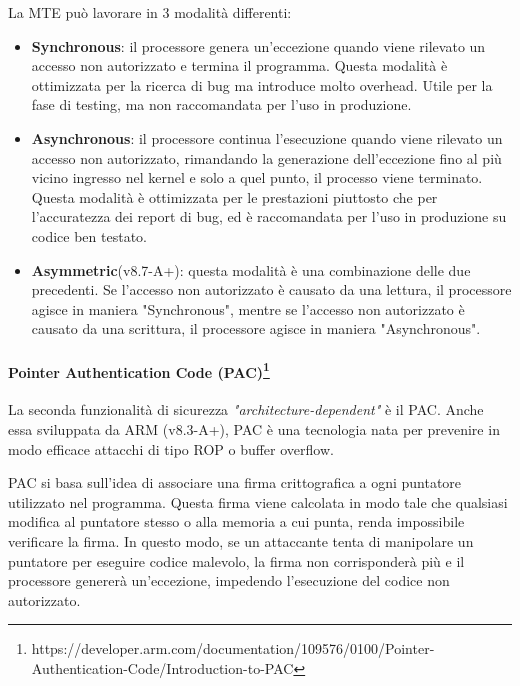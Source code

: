 La MTE può lavorare in 3 modalità differenti:
\begin{itemize}
  \item \textbf{Synchronous}: il processore genera un'eccezione quando viene rilevato
    un accesso non autorizzato e termina il programma. Questa modalità è
    ottimizzata per la ricerca di bug ma introduce molto overhead. Utile per la fase
    di testing, ma non raccomandata per l'uso in produzione.

  \item \textbf{Asynchronous}: il processore continua l'esecuzione quando viene rilevato
    un accesso non autorizzato, rimandando la generazione dell'eccezione fino al
    più vicino ingresso nel kernel e solo a quel punto, il processo viene terminato.
    Questa modalità è ottimizzata per le prestazioni piuttosto che per l'accuratezza
    dei report di bug, ed è raccomandata per l'uso in produzione su codice ben testato.

  \item \textbf{Asymmetric}(v8.7-A+): questa modalità è una combinazione delle
    due precedenti. Se l'accesso non autorizzato è causato da una lettura, il
    processore agisce in maniera "Synchronous", mentre se l'accesso non autorizzato
    è causato da una scrittura, il processore agisce in maniera "Asynchronous".
\end{itemize}

\paragraph{Pointer Authentication Code (PAC)\protect\footnote{https://developer.arm.com/documentation/109576/0100/Pointer-Authentication-Code/Introduction-to-PAC}}
La seconda funzionalità di sicurezza \textit{"architecture-dependent"} è il PAC.
Anche essa sviluppata da ARM (v8.3-A+), PAC è una tecnologia nata per prevenire in
modo efficace attacchi di tipo ROP o buffer overflow.

PAC si basa sull'idea di associare una firma crittografica a ogni puntatore utilizzato
nel programma. Questa firma viene calcolata in modo tale che qualsiasi modifica
al puntatore stesso o alla memoria a cui punta, renda impossibile verificare la firma.
In questo modo, se un attaccante tenta di manipolare un puntatore per eseguire codice
malevolo, la firma non corrisponderà più e il processore genererà un'eccezione, impedendo
l'esecuzione del codice non autorizzato.

